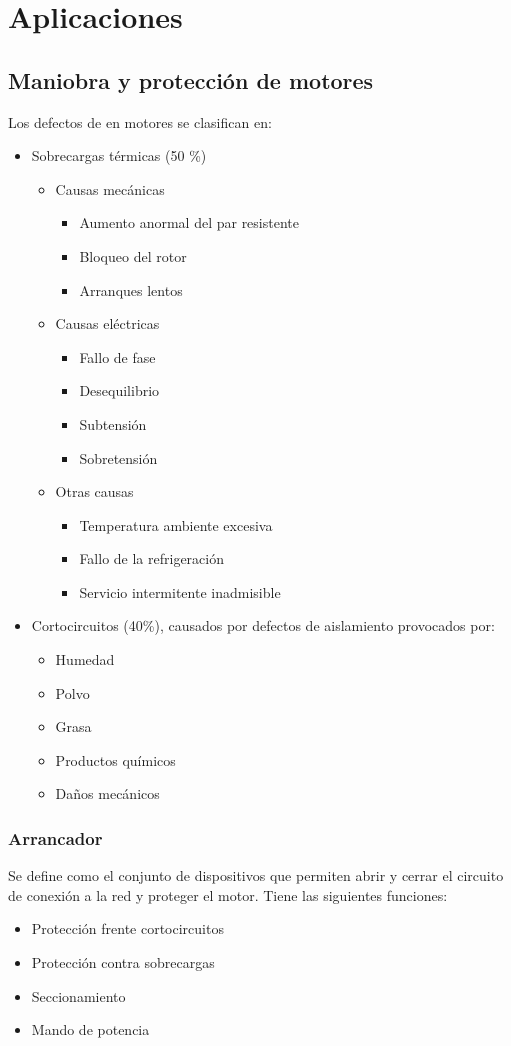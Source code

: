 \chapter{Aplicaciones}
\section{Maniobra y protección de motores}
Los defectos de en motores se clasifican en:
\begin{itemize}
	\item Sobrecargas térmicas (50 \%)
	\begin{itemize}
		\item Causas mecánicas
		\begin{itemize}
			\item Aumento anormal del par resistente
			\item
			Bloqueo del rotor
			\item
			Arranques lentos
		\end{itemize}
		\item Causas eléctricas
		\begin{itemize}
			\item Fallo de fase
			\item
			Desequilibrio
			\item
			Subtensión
			\item
			Sobretensión
		\end{itemize}
		\item Otras causas
		\begin{itemize}
			\item Temperatura ambiente excesiva
			\item
			Fallo de la refrigeración
			\item
			Servicio intermitente inadmisible
		\end{itemize}
	\end{itemize}
	\item Cortocircuitos (40\%), causados por defectos de aislamiento provocados por:
	\begin{itemize}
		\item Humedad
	\item
		Polvo
		\item
		Grasa
		\item
		Productos químicos
	\item
		Daños mecánicos 
	\end{itemize}
	
\end{itemize}
\subsection{Arrancador}
Se define como el conjunto de dispositivos que permiten abrir y cerrar el circuito de conexión a la red y proteger el motor. Tiene las siguientes funciones:
\begin{itemize}
	\item Protección frente cortocircuitos
	\item Protección contra sobrecargas
	\item Seccionamiento
	\item Mando de potencia
\end{itemize}

